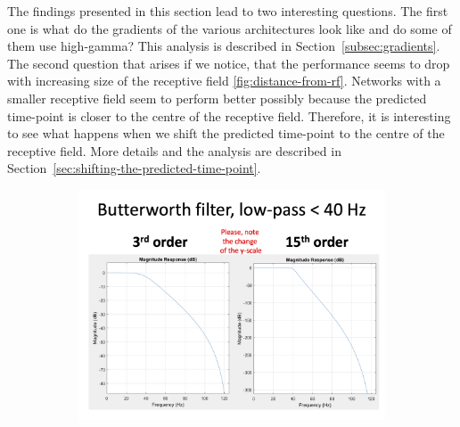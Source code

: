 The findings presented in this section lead to two interesting questions.
The first one  is what do the gradients of the various architectures look like and do some of them use high-gamma?
This analysis is described in Section~\ref{subsec:gradients}.
The second question that arises if we notice, that the performance seems to drop with increasing size of the receptive field \cref{fig:distance-from-rf}.
Networks with a smaller receptive field seem to perform better possibly because the predicted time-point is closer to the centre of the receptive field.
Therefore, it is interesting to see what happens when we shift the predicted time-point to the centre of the receptive field.
More details and the analysis are described in Section~\ref{sec:shifting-the-predicted-time-point}.

\begin{figure}[!htpb]
\centering
\begin{subfigure}[b]{0.65\textwidth}
   \includegraphics[width=1\linewidth]{img/ch3/lp-butterworth-filter}
   \caption{}\label{fig:lp-filters}
\end{subfigure}


\end{figure}
